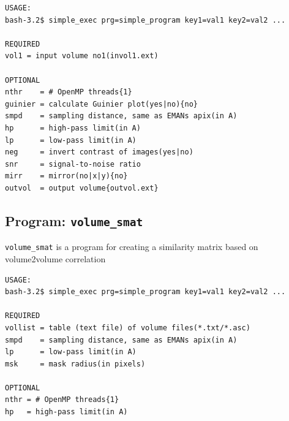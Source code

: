 \documentclass[a4paper,11pt]{article}
\newcommand{\prgname}[1]{\textcolor{NavyBlue}{\texttt{#1}}}
\begin{document}
\begin{verbatim}
USAGE:
bash-3.2$ simple_exec prg=simple_program key1=val1 key2=val2 ...

REQUIRED
vol1 = input volume no1(invol1.ext)

OPTIONAL
nthr    = # OpenMP threads{1}
guinier = calculate Guinier plot(yes|no){no}
smpd    = sampling distance, same as EMANs apix(in A)
hp      = high-pass limit(in A)
lp      = low-pass limit(in A)
neg     = invert contrast of images(yes|no)
snr     = signal-to-noise ratio
mirr    = mirror(no|x|y){no}
outvol  = output volume{outvol.ext}
\end{verbatim}

\subsection{Program: \prgname{volume\_smat}}
\label{volume_smat}
\prgname{volume\_smat} is a program for creating a similarity matrix based on volume2volume correlation

\begin{verbatim}
USAGE:
bash-3.2$ simple_exec prg=simple_program key1=val1 key2=val2 ...

REQUIRED
vollist = table (text file) of volume files(*.txt/*.asc)
smpd    = sampling distance, same as EMANs apix(in A)
lp      = low-pass limit(in A)
msk     = mask radius(in pixels)

OPTIONAL
nthr = # OpenMP threads{1}
hp   = high-pass limit(in A)
\end{verbatim}

\def\bibfont{\footnotesize}


\end{document}

